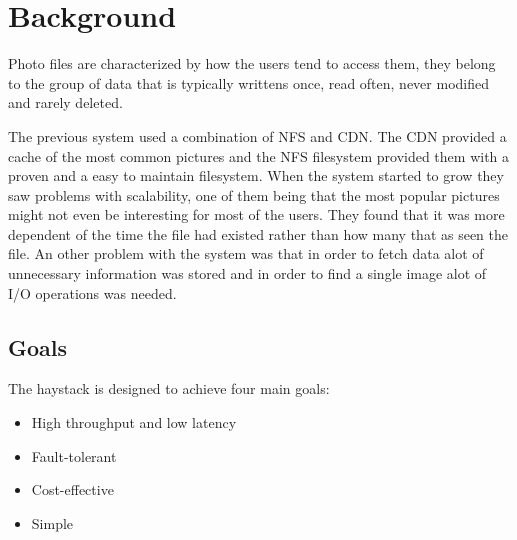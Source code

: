 \section{Background}
Photo files are characterized by how the users tend to access them, they belong 
to the group of data that is typically writtens once, read often, never modified 
and rarely deleted.
 
The previous system used a combination of NFS and CDN. The CDN provided a cache of  
the most common pictures and the NFS filesystem provided them with a proven and
a easy to maintain filesystem. When the system started to grow they saw problems
with scalability, one of them being that the most popular pictures might not even be 
interesting for most of the users. They found that it was more dependent of the time 
the file had existed rather than how many that as seen the file. An other problem with
the system was that in order to fetch data alot of unnecessary information was stored 
and in order to find a single image alot of I/O operations was needed.\\
\subsection{Goals}
The haystack is designed to achieve four main goals:
\begin{itemize}
  \item High throughput and low latency
  \item Fault-tolerant
  \item Cost-effective
  \item Simple
\end{itemize} 





